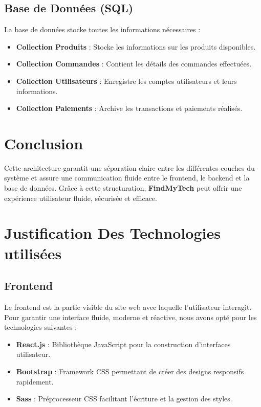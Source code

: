 \documentclass[a4paper,12pt]{article}
\begin{document}
\subsection{Base de Données (SQL)}
La base de données stocke toutes les informations nécessaires :
\begin{itemize}
    \item \textbf{Collection Produits} : Stocke les informations sur les produits disponibles.
    \item \textbf{Collection Commandes} : Contient les détails des commandes effectuées.
    \item \textbf{Collection Utilisateurs} : Enregistre les comptes utilisateurs et leurs informations.
    \item \textbf{Collection Paiements} : Archive les transactions et paiements réalisés.
\end{itemize}

\section{Conclusion}
Cette architecture garantit une séparation claire entre les différentes couches du système et assure une communication fluide entre le frontend, le backend et la base de données. Grâce à cette structuration, \textbf{FindMyTech} peut offrir une expérience utilisateur fluide, sécurisée et efficace.
\section{Justification Des Technologies utilisées}
\subsection{Frontend}
Le frontend est la partie visible du site web avec laquelle l’utilisateur interagit. Pour garantir une interface fluide, moderne et réactive, nous avons opté pour les technologies suivantes :

\begin{itemize}
    \item \textbf{React.js} : Bibliothèque JavaScript pour la construction d’interfaces utilisateur.
    \item \textbf{Bootstrap} : Framework CSS permettant de créer des designs responsifs rapidement.
    \item \textbf{Sass} : Préprocesseur CSS facilitant l’écriture et la gestion des styles.
\end{itemize}
\end{document}
